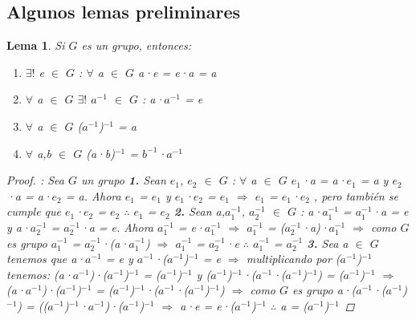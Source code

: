 \documentclass[10pt,a4paper,oneside]{article}
\newtheorem{lem}{Lema}[section]
\begin{document}
			\subsection{Algunos lemas preliminares}
				\begin{lem}
					Si $G$ es un grupo, entonces:
					\begin{enumerate}
						\item $\exists!$ e $\in$ $G$ : $\forall$ a $\in$ $G$ a·e = e·a = a
						\item $\forall$ a $\in$ $G$ $\exists!$ $a^{-1}$ $\in$ $G$ : a·$a^{-1}$ = e
						\item $\forall$ a $\in$ $G$ ($a^{-1}$)$^{-1}$ = a
						\item $\forall$ a,b $\in$ $G$ (a·b)$^{-1}$ = $b^{-1}$·$a^{-1}$
					\end{enumerate}
					\begin{proof}:
						\newline
						Sea $G$ un grupo
						\newline
						\newline
						\textbf{1.} Sean $e_{1}$, $e_{2}$ $\in$ $G$ : $\forall$ a $\in$ $G$ $e_{1}$·a = a·$e_{1}$ = a y $e_{2}$·a = a·$e_{2}$ = a. Ahora $e_{1}$ = $e_{1}$ y $e_{1}$·$e_{2}$ = $e_{1}$ $\Rightarrow$ $e_{1}$ = $e_{1}$·$e_{2}$ ,  pero también se cumple que $e_{1}$·$e_{2}$ = $e_{2}$
						\newline
						$\therefore$ $e_{1}$ = $e_{2}$
						\newline
						\newline
						\textbf{2.} Sean a,$a_{1}^{-1}$, $a_{2}^{-1}$ $\in$ $G$ : a·$a_{1}^{-1}$ = $a_{1}^{-1}$·a = e y a·$a_{2}^{-1}$ = $a_{2}^{-1}$·a = e. Ahora $a_{1}^{-1}$ = e·$a_{1}^{-1}$ $\Rightarrow$ $a_{1}^{-1}$ = ($a_{2}^{-1}$·a)·$a_{1}^{-1}$ $\Rightarrow$ como $G$ es grupo $a_{1}^{-1}$ = $a_{2}^{-1}$·(a·$a_{1}^{-1}$) $\Rightarrow$ $a_{1}^{-1}$ = $a_{2}^{-1}$·e 
						\newline
						$\therefore$ $a_{1}^{-1}$ = $a_{2}^{-1}$
						\newline
						\newline
						\textbf{3.} Sea a $\in$ $G$ tenemos que a·$a^{-1}$ = e y $a^{-1}$·($a^{-1}$)$^{-1}$ = e $\Rightarrow$ multiplicando por ($a^{-1}$)$^{-1}$ tenemos: (a·$a^{-1}$)·($a^{-1}$)$^{-1}$ = ($a^{-1}$)$^{-1}$ y ($a^{-1}$)$^{-1}$·($a^{-1}$·($a^{-1}$)$^{-1}$) = ($a^{-1}$)$^{-1}$ $\Rightarrow$ (a·$a^{-1}$)·($a^{-1}$)$^{-1}$ = ($a^{-1}$)$^{-1}$·($a^{-1}$·($a^{-1}$)$^{-1}$) $\Rightarrow$ como $G$ es grupo a·($a^{-1}$·($a^{-1}$)$^{-1}$) = (($a^{-1}$)$^{-1}$·$a^{-1}$)·($a^{-1}$)$^{-1}$ $\Rightarrow$ a·e = e·($a^{-1}$)$^{-1}$ $\therefore$ a = ($a^{-1}$)$^{-1}$

\end{proof}
\end{lem}
\end{document}
